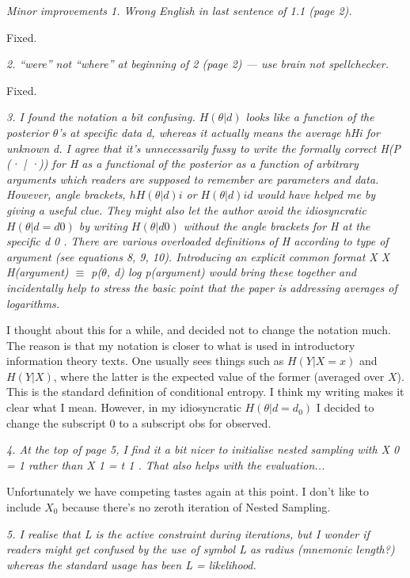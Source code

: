\documentclass[a4paper, 12pt]{article}
\renewcommand{\quote}{\em \color{orange}}
\begin{document}
{\quote
Minor improvements
1. Wrong English in last sentence of 1.1 (page 2).}

Fixed.

{\quote
2. “were” not “where” at beginning of 2 (page 2) — use brain not spellchecker.}

Fixed.

{\quote
3. I found the notation a bit confusing. $H(\theta | d)$ looks like a function of the posterior $\theta$’s at specific
data d, whereas it actually means the average hHi for unknown d. I agree that it’s unnecessarily fussy
to write the formally correct H(P (· | ·)) for H as a functional of the posterior as a function of arbitrary
arguments which readers are supposed to remember are parameters and data. However, angle brackets,
$hH(\theta | d)i$ or $H(\theta | d)i d$ would have helped me by giving a useful clue. They might also let the author
avoid the idiosyncratic $H(\theta | d = d 0 )$ by writing $H(\theta | d 0 )$ without the angle brackets for H at the specific
d 0 .
There are various overloaded definitions of H according to type of argument (see equations 8, 9, 10).
Introducing an explicit common format
X X
H(argument) $\equiv$
p($\theta$, d) log p(argument)
would bring these together and incidentally help to stress the basic point that the paper is addressing
averages of logarithms.}

I thought about this for a while, and decided not to change the notation much.
The reason is that my notation is closer to what is used in introductory
information theory texts. One usually sees things such as $H(Y|X=x)$
and $H(Y|X)$, where the latter is the expected value of the former (averaged
over $X$). This is the standard definition of conditional entropy.
I think my writing makes it clear what I mean.
However, in my idiosyncratic $H(\theta | d = d_0)$ I decided to change the
subscript 0 to a subscript obs for observed.

{\quote
4. At the top of page 5, I find it a bit nicer to initialise nested sampling with X 0 = 1 rather than
X 1 = t 1 . That also helps with the evaluation...}

Unfortunately we have competing tastes again at this point.
I don't like to include $X_0$ because there's no zeroth iteration of Nested Sampling.

{\quote
5. I realise that L is the active constraint during iterations, but I wonder if readers might get confused
by the use of symbol L as radius (mnemonic length?) whereas the standard usage has been L = likelihood.}
\end{document}

